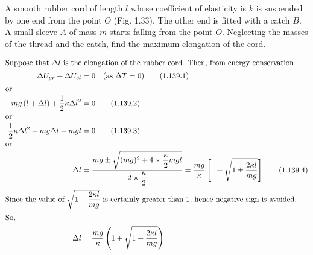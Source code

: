 \item A smooth rubber cord of length $l$ whose coefficient of elasticity is $k$ is suspended by one end from the point $O$ (Fig. 1.33). The other end is fitted with a catch $B$. A small sleeve $A$ of mass $m$ starts falling from the point $O$. Neglecting the masses of the thread and the catch, find the maximum elongation of the cord.
    \begin{center}
    \end{center}\begin{solution}
    \begin{align*}
        \intertext{Suppose that $\Delta l$ is the elongation of the rubber cord. Then, from energy conservation}
        \Delta U_{gr} + \Delta U_{el} &= 0 \quad \text{(as $\Delta T = 0$)} \tag{1.139.1}\\
        \intertext{or}
        -mg \left(l + \Delta l \right) + \dfrac{1}{2} \kappa \Delta l^2 &= 0 \tag{1.139.2}\\
        \intertext{or}
        \dfrac{1}{2} \kappa \Delta l^2 - mg \Delta l - mgl &= 0 \tag{1.139.3}\\
        \intertext{or}
        \Delta l &= \dfrac{mg \pm \sqrt{(mg)^2 + 4 \times \dfrac{\kappa}{2} mgl}}{2 \times \dfrac{\kappa}{2}} = \dfrac{mg}{\kappa} \left[ 1 + \sqrt{1 \pm \dfrac{2 \kappa l}{mg}} \right] \tag{1.139.4} \\
        \intertext{Since the value of $\sqrt{1 + \dfrac{2 \kappa l}{mg}}$ is certainly greater than $1$, hence negative sign is avoided.}
        \intertext{So,}
        \Delta l &= \dfrac{mg}{\kappa} \left( 1 + \sqrt{1 + \dfrac{2 \kappa l}{mg}} \right)
    \end{align*}
\end{solution}